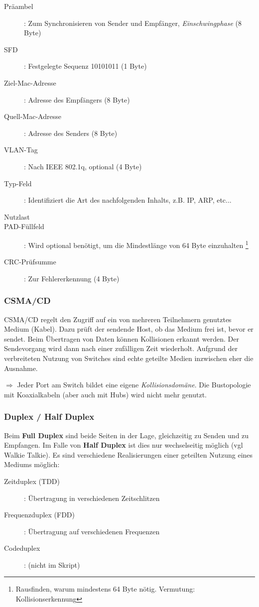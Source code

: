 \documentclass{article} %
\begin{document}
\begin{description}
	\item[Präambel]: Zum Synchronisieren von Sender und Empfänger, \emph{Einschwingphase} (8 Byte)
	\item[SFD]: Festgelegte Sequenz 10101011 (1 Byte)
	\item[Ziel-Mac-Adresse]: Adresse des Empfängers (8 Byte)
	\item[Quell-Mac-Adresse]: Adresse des Senders (8 Byte)
	\item[VLAN-Tag]: Nach IEEE 802.1q, optional (4 Byte)
	\item[Typ-Feld]: Identifiziert die Art des nachfolgenden Inhalts, z.B. IP, ARP, etc...
	\item[Nutzlast]
	\item[PAD-Füllfeld]: Wird optional benötigt, um die Mindestlänge von 64 Byte einzuhalten \footnote{Rausfinden, warum mindestens 64 Byte nötig. Vermutung: Kollisionserkennung}
	\item[CRC-Prüfsumme]: Zur Fehlererkennung (4 Byte)
\end{description}

\subsubsection{CSMA/CD}

CSMA/CD regelt den Zugriff auf ein von mehreren Teilnehmern genutztes Medium (Kabel).
Dazu prüft der sendende Host, ob das Medium frei ist, bevor er sendet.
Beim Übertragen von Daten können Kollisionen erkannt werden.
Der Sendevorgang wird dann nach einer zufälligen Zeit wiederholt.
Aufgrund der verbreiteten Nutzung von Switches sind echte geteilte Medien inzwischen eher die Ausnahme.

$\Rightarrow$ Jeder Port am Switch bildet eine eigene \emph{Kollisionsdomäne}.
Die Bustopologie mit Koaxialkabeln (aber auch mit Hubs) wird nicht mehr genutzt.

\subsubsection{Duplex / Half Duplex}

Beim \textbf{Full Duplex} sind beide Seiten in der Lage, gleichzeitig zu Senden und zu Empfangen.
Im Falle von \textbf{Half Duplex} ist dies nur wechselseitig möglich (vgl Walkie Talkie).
Es sind verschiedene Realisierungen einer geteilten Nutzung eines Mediums möglich:

\begin{description}
	\item [Zeitduplex (TDD)]: Übertragung in verschiedenen Zeitschlitzen
	\item [Frequenzduplex (FDD)]: Übertragung auf verschiedenen Frequenzen
	\item [Codeduplex]: (nicht im Skript)
\end{description}
\end{document}
